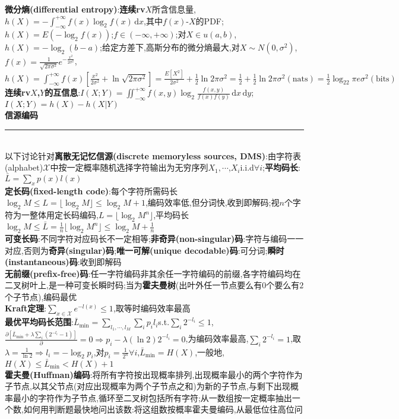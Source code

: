 \documentclass[UTF8,a4paper,10pt]{article}
\begin{document}
\begin{multicols*}{2}
\textbf{微分熵(differential entropy)}:\textbf{连续rv}$X$所含信息量,$h(X)=-\int_{-\infty}^{+\infty}f(x)\log_2f(x)\,\mathrm{d}x$,其中$f(x)$-$X$的PDF;$h(X)=E(-\log_2f(x))$;$f\in(-\infty,+\infty)$;对$X\in u(a,b)$,$h(X)=-\log_2(b-a)$;给定方差下,高斯分布的微分熵最大,对$X\sim N(0,\sigma^2)$,$f(x)=\frac{1}{\sqrt{2\pi\sigma^2}}e^{-\frac{x^2}{2\sigma^2}}$,$h(X)=\int_{-\infty}^{+\infty}f(x)[\frac{x^2}{2\sigma^2}+\ln\sqrt{2\pi\sigma^2}]=\frac{E[X^2]}{2\sigma^2}+\frac{1}{2}\ln 2\pi\sigma^2=\frac{1}{2}+\frac{1}{2}\ln 2\pi\sigma^2(\text{nats})=\frac{1}{2}\log_22\pi e\sigma^2(\text{bits})$\\
\textbf{连续rv$X$,$Y$的互信息}:$I(X;Y)=\iint_{-\infty}^{+\infty}f(x,y)\log_2\frac{f(x,y)}{f(x)f(y)}\,\mathrm{d}x\,\mathrm{d}y$;$I(X;Y)=h(X)-h(X\vert Y)$\\
\textbf{信源编码}\rule{\columnwidth-}{.2pt}\\
以下讨论针对\textbf{离散无记忆信源(discrete memoryless sources, DMS)}:由字符表(alphabet)$\mathcal{X}$中按一定概率随机选择字符输出为无穷序列$X_1,\cdots$,$X_i$i.i.d$\forall i$;\textbf{平均码长}:$\bar{L}=\sum_xp(x)l(x)$\\
\textbf{定长码(fixed-length code)}:每个字符所需码长$\log_2M\leq L=\lfloor\log_2M\rfloor\leq\log_2M+1$,编码效率低,但分词快,收到即解码;视$n$个字符为一整体用定长码编码,$L=\lfloor\log_2M^n\rfloor$,平均码长$\log_2M\leq\bar{L}=\frac{1}{n}\lfloor\log_2M^n\rfloor\leq\log_2M+\frac{1}{n}$\\
\textbf{可变长码}:不同字符对应码长不一定相等;\textbf{非奇异(non-singular)码}:字符与编码一一对应,否则为\textbf{奇异(singular)码};\textbf{唯一可解(unique decodable)码}:可分词;\textbf{瞬时(instantaneous)码}:收到即解码\\
\textbf{无前缀(prefix-free)码}:任一字符编码非其余任一字符编码的前缀,各字符编码均在二叉树叶上,是一种可变长瞬时码;当为\textbf{霍夫曼树}(出叶外任一节点要么有$0$个要么有$2$个子节点),编码最优\\
\textbf{Kraft定理}:$\sum_{x\in\mathcal{X}}e^{-l(x)}\leq 1$,取等时编码效率最高\\
\textbf{最优平均码长范围}:$\bar{L}_{\min}=\sum_{l_1,\cdots,l_M}\sum_ip_il_i$s.t.$\sum_i2^{-l_i}\leq 1$,$\frac{\partial[\bar{L}_{\min}+\lambda\sum_i(2^{-l_i}-1)]}{\partial}=0\Rightarrow p_i-\lambda(\ln 2)2^{-l_i}=0$,为编码效率最高,$\sum_i2^{-l_i}=1$,取$\lambda=\frac{1}{\ln 2}\Rightarrow l_i=-\log_2p_i$,对$p_i=\frac{1}{2^n}\forall i$,$\bar{L}_{\min}=H(X)$,一般地,$H(X)\leq\bar{L}_{\min}<H(X)+1$\\
\textbf{霍夫曼(Huffman)编码}:将所有字符按出现概率排列,出现概率最小的两个字符作为子节点,以其父节点(对应出现概率为两个子节点之和)为新的子节点,与剩下出现概率最小的字符作为子节点,循环至二叉树包括所有字符;从一数组按一定概率抽出一个数,如何用判断题最快地问出该数:将这组数按概率霍夫曼编码,从最低位往高位问\\

\end{multicols*}
\end{document}
